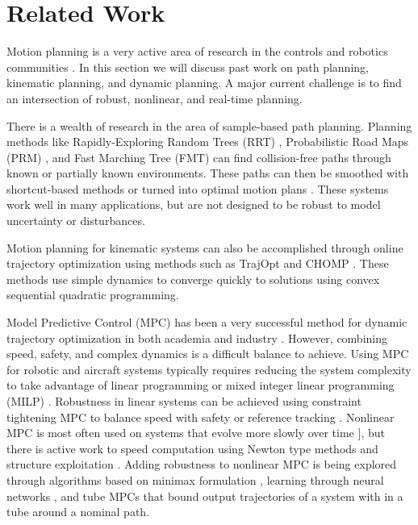\section{Related Work \label{sec:relatedwork}}
Motion planning is a very active area of research in the controls and robotics communities \cite{Hoy2015}.  In this section we will discuss past work on path planning, kinematic planning, and dynamic planning.  A major current challenge is to find an intersection of robust, nonlinear, and real-time planning. 

There is a wealth of research in the area of sample-based path planning.  Planning methods like Rapidly-Exploring Random Trees (RRT) \cite{Kuffner2000}, Probabilistic Road Maps (PRM) \cite{Kavraki1996}, and Fast Marching Tree (FMT) \cite{Janson2015} can find collision-free paths through known or partially known environments.  These paths can then be smoothed with shortcut-based methods or turned into optimal motion plans \cite{Richter2016, Karaman2011, Kobilarov2012}.  These systems work well in many applications, but are not designed to be robust to model uncertainty or disturbances.

Motion planning for kinematic systems can also be accomplished through online trajectory optimization using methods such as TrajOpt \cite{Schulman2013} and CHOMP \cite{Ratliff2009}.  These methods use simple dynamics to converge quickly to solutions using convex sequential quadratic programming. 

Model Predictive Control (MPC) has been a very successful method for dynamic trajectory optimization in both academia and industry \cite{Qin2003}.  However, combining speed, safety, and complex dynamics is a difficult balance to achieve. Using MPC for robotic and aircraft systems typically requires reducing the system complexity to take advantage of linear programming or mixed integer linear programming (MILP) \cite{Alexis2016, Bellingham2002, Vitus2008, Zeilinger2011, Richter2012}. Robustness in linear systems can be achieved using constraint tightening MPC to balance speed with safety \cite{Kuwata2007, Richards2006} or reference tracking \cite{DiCairano2016}. Nonlinear MPC is most often used on systems that evolve more slowly over time \cite{Diehl2002, Schildbach2016}], but there is active work to speed computation using Newton type methods and structure exploitation \cite{Diehl2009,Findeisen2007, Grune2011, Quirynen2015, Gupta2015, Neunert2016, Torrisi2016}. Adding robustness to nonlinear MPC is being explored through algorithms based on minimax formulation \cite{Lofberg2003, Kumar2014}, learning through neural networks \cite{Yan2014}, and tube MPCs \cite{Mayne2011, Cannon2011, Kumar2014, Gao2014} that bound output trajectories of a system with in a tube around a nominal path.

